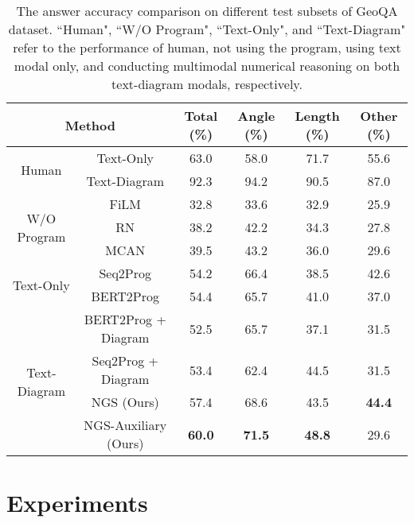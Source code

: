 \documentclass[11pt,a4paper]{article}
\begin{document}
\begin{table*}[htbp]
\centering
\resizebox{0.9\linewidth}{!} {
\begin{tabular}{c|c|c|c|c|c}
\hline
\multicolumn{2}{c|}{Method} & Total (\%) & Angle (\%) & Length (\%) & Other (\%)  \\
\hline\hline
\multirow{2}{*}{Human} 
& Text-Only & 63.0 & 58.0 & 71.7 & 55.6 \\
& Text-Diagram & 92.3 & 94.2 & 90.5 & 87.0 \\
\hline
\multirow{3}{*}{W/O Program} 
& FiLM \cite{perez2017film} & 32.8 & 33.6 & 32.9 & 25.9 \\
& RN \cite{santoro2017simple} & 38.2 & 42.2 & 34.3 & 27.8 \\
& MCAN \cite{yu2019deep} & 39.5 & 43.2 & 36.0 & 29.6 \\

\hline

\multirow{2}{*}{Text-Only}
& Seq2Prog \cite{amini2019mathqa}& 54.2 & 66.4 & 38.5 & 42.6 \\
& BERT2Prog \cite{devlin2018bert}& 54.4 & 65.7 & 41.0 & 37.0 \\

\hline

\multirow{4}{*}{Text-Diagram} 
& BERT2Prog + Diagram & 52.5 & 65.7 & 37.1 & 31.5 \\
& Seq2Prog + Diagram & 53.4 & 62.4 & 44.5 & 31.5 \\
& NGS (Ours) & 57.4 & 68.6 & 43.5 & \textbf{44.4} \\
& NGS-Auxiliary (Ours) & \textbf{60.0} & \textbf{71.5} & \textbf{48.8} & 29.6 \\
\hline
\end{tabular}
}
\caption{The answer accuracy comparison on different test subsets of GeoQA dataset. ``Human", ``W/O Program", ``Text-Only", and ``Text-Diagram" refer to the performance of human, not using the program, using text modal only, and conducting multimodal numerical reasoning on both text-diagram modals, respectively.}
\label{table-baselines}
\end{table*}

\section{Experiments}
\end{document}
